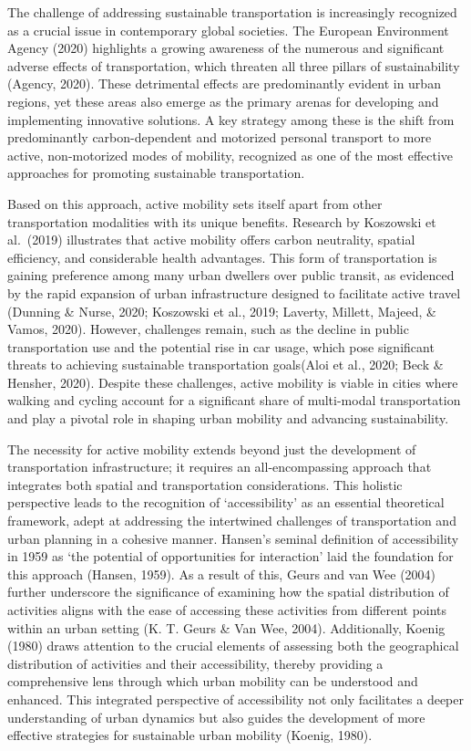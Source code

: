 \documentclass[
11pt, %
oneside, %
english, %
singlespacing, %
]{macthesis} %
\begin{document}
The challenge of addressing sustainable transportation is increasingly recognized as a crucial issue in contemporary global societies. The European Environment Agency (2020) highlights a growing awareness of the numerous and significant adverse effects of transportation, which threaten all three pillars of sustainability (Agency, 2020). These detrimental effects are predominantly evident in urban regions, yet these areas also emerge as the primary arenas for developing and implementing innovative solutions. A key strategy among these is the shift from predominantly carbon-dependent and motorized personal transport to more active, non-motorized modes of mobility, recognized as one of the most effective approaches for promoting sustainable transportation.

Based on this approach, active mobility sets itself apart from other transportation modalities with its unique benefits. Research by Koszowski et al.~(2019) illustrates that active mobility offers carbon neutrality, spatial efficiency, and considerable health advantages. This form of transportation is gaining preference among many urban dwellers over public transit, as evidenced by the rapid expansion of urban infrastructure designed to facilitate active travel (Dunning \& Nurse, 2020; Koszowski et al., 2019; Laverty, Millett, Majeed, \& Vamos, 2020). However, challenges remain, such as the decline in public transportation use and the potential rise in car usage, which pose significant threats to achieving sustainable transportation goals(Aloi et al., 2020; Beck \& Hensher, 2020). Despite these challenges, active mobility is viable in cities where walking and cycling account for a significant share of multi-modal transportation and play a pivotal role in shaping urban mobility and advancing sustainability.

The necessity for active mobility extends beyond just the development of transportation infrastructure; it requires an all-encompassing approach that integrates both spatial and transportation considerations. This holistic perspective leads to the recognition of `accessibility' as an essential theoretical framework, adept at addressing the intertwined challenges of transportation and urban planning in a cohesive manner. Hansen's seminal definition of accessibility in 1959 as `the potential of opportunities for interaction' laid the foundation for this approach (Hansen, 1959). As a result of this, Geurs and van Wee (2004) further underscore the significance of examining how the spatial distribution of activities aligns with the ease of accessing these activities from different points within an urban setting (K. T. Geurs \& Van Wee, 2004). Additionally, Koenig (1980) draws attention to the crucial elements of assessing both the geographical distribution of activities and their accessibility, thereby providing a comprehensive lens through which urban mobility can be understood and enhanced. This integrated perspective of accessibility not only facilitates a deeper understanding of urban dynamics but also guides the development of more effective strategies for sustainable urban mobility (Koenig, 1980).
\end{document}
